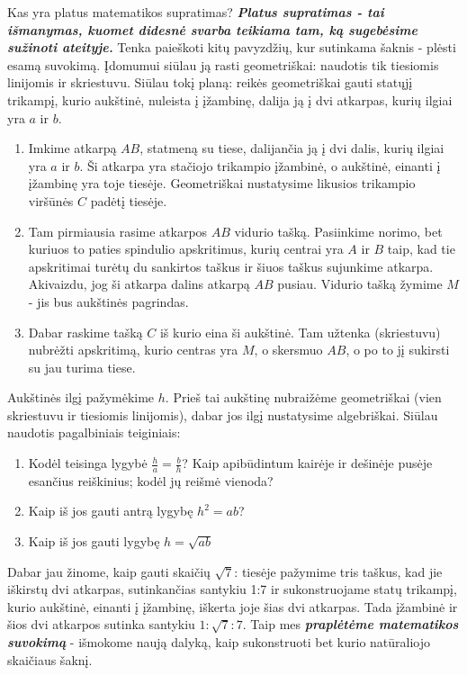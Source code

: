 \documentclass{article}
\begin{document}
\begin{mybox}{Kas yra platus matematikos supratimas?}
\textit{\textbf{Platus supratimas - tai išmanymas, kuomet didesnė svarba teikiama tam, ką sugebėsime sužinoti ateityje.}} Tenka paieškoti kitų pavyzdžių, kur sutinkama šaknis - plėsti esamą suvokimą. Įdomumui siūlau ją rasti geometriškai: naudotis tik tiesiomis linijomis ir skriestuvu. Siūlau tokį planą: reikės geometriškai gauti statųjį trikampį, kurio aukštinė, nuleista į įžambinę, dalija ją į dvi atkarpas, kurių ilgiai yra $a$ ir $b$.
\begin{enumerate}
\item Imkime atkarpą $AB$, statmeną su tiese, dalijančia ją į dvi dalis, kurių ilgiai yra $a$ ir $b$. Ši atkarpa yra stačiojo trikampio įžambinė, o aukštinė, einanti į įžambinę yra toje tiesėje. Geometriškai nustatysime likusios trikampio viršūnės $C$ padėtį tiesėje.
\item Tam pirmiausia rasime atkarpos $AB$ vidurio tašką. Pasiinkime norimo, bet kuriuos to paties spindulio apskritimus, kurių centrai yra $A$ ir $B$ taip, kad tie apskritimai turėtų du sankirtos taškus ir šiuos taškus sujunkime atkarpa. Akivaizdu, jog ši atkarpa dalins atkarpą $AB$ pusiau. Vidurio tašką žymime $M$ - jis bus aukštinės pagrindas.
\item Dabar raskime tašką $C$ iš kurio eina ši aukštinė. Tam užtenka (skriestuvu) nubrėžti apskritimą, kurio centras yra $M$, o skersmuo $AB$, o po to jį sukirsti su jau turima tiese. 
\end{enumerate}
Aukštinės ilgį pažymėkime $h$. Prieš tai aukštinę nubraižėme geometriškai (vien skriestuvu ir tiesiomis linijomis), dabar jos ilgį nustatysime algebriškai. Siūlau naudotis pagalbiniais teiginiais:
\begin{enumerate}
\item Kodėl teisinga lygybė $\frac{h}{a}=\frac{b}{h}$? Kaip apibūdintum kairėje ir dešinėje pusėje esančius reiškinius; kodėl jų reišmė vienoda?
\item Kaip iš jos gauti antrą lygybę $h^2=ab$?
\item Kaip iš jos gauti lygybę $h=\sqrt{ab}$
\end{enumerate}
Dabar jau žinome, kaip gauti skaičių $\sqrt{7}$: tiesėje pažymime tris taškus, kad jie iškirstų dvi atkarpas, sutinkančias santykiu 1:7 ir sukonstruojame statų trikampį, kurio aukštinė, einanti į įžambinę, iškerta joje šias dvi atkarpas. Tada įžambinė ir šios dvi atkarpos sutinka santykiu $1:\sqrt{7}:7$. Taip mes \textbf{\textit{praplėtėme matematikos suvokimą}} - išmokome naują dalyką, kaip sukonstruoti bet kurio natūraliojo skaičiaus šaknį. 
\end{mybox}
\end{document}
